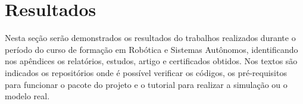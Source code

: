 \chapter{Resultados}
\label{chap:result}
Nesta seção serão demonstrados os resultados do trabalhos realizados durante o período do curso de formação em Robótica e Sistemas Autônomos, identificando nos apêndices os relatórios, estudos, artigo e certificados obtidos. Nos textos são indicados os repositórios onde é possível verificar os códigos, os pré-requisitos para funcionar o pacote do projeto e o tutorial para realizar a simulação ou o modelo real.



